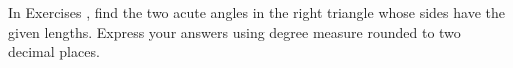 {\noindent In Exercises}
{, find the two acute angles in the right triangle whose sides have the given lengths.  Express your answers using degree measure rounded to two decimal places.}
